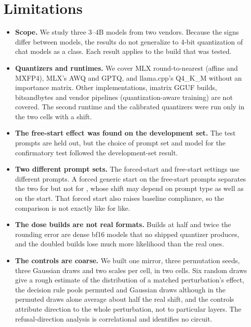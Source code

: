 \clearpage
\section*{Limitations}
\begin{itemize}
\setlength\itemsep{1pt}
\item \textbf{Scope.} We study three 3--4B models from two vendors. Because the signs differ between models, the results do not generalize to 4-bit quantization of chat models as a class. Each result applies to the build that was tested.
\item \textbf{Quantizers and runtimes.} We cover MLX round-to-nearest (affine and MXFP4), MLX's AWQ and GPTQ, and llama.cpp's Q4\_K\_M without an importance matrix. Other implementations, imatrix GGUF builds, bitsandbytes and vendor pipelines (quantization-aware training) are not covered. The second runtime and the calibrated quantizers were run only in the two cells with a shift.
\item \textbf{The free-start effect was found on the development set.} The test prompts are held out, but the choice of prompt set and model for the confirmatory test followed the development-set result.
\item \textbf{Two different prompt sets.} The forced-start and free-start settings use different prompts. A forced generic start on the free-start prompts separates the two for \llama{} but not for \qwen, whose shift may depend on prompt type as well as on the start. That forced start also raises baseline compliance, so the comparison is not exactly like for like.
\item \textbf{The dose builds are not real formats.} Builds at half and twice the rounding error are dense bf16 models that no shipped quantizer produces, and the doubled builds lose much more likelihood than the real ones.
\item \textbf{The controls are coarse.} We built one mirror, three permutation seeds, three Gaussian draws and two scales per cell, in two cells. Six random draws give a rough estimate of the distribution of a matched perturbation's effect, the decision rule pools permuted and Gaussian draws although in \llama{} the permuted draws alone average about half the real shift, and the controls attribute direction to the whole perturbation, not to particular layers. The refusal-direction analysis is correlational and identifies no circuit.

\end{itemize}
